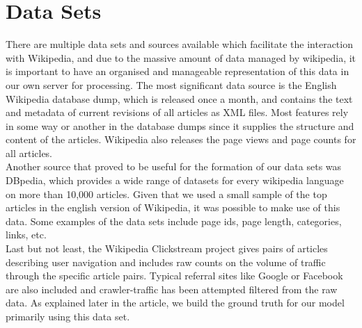 \section{Data Sets}

There are multiple data sets and sources available which facilitate the interaction with Wikipedia, and due to the massive amount of data managed by wikipedia, it is important to have an organised and manageable representation of this data in our own server for processing. The most significant data source is the English Wikipedia database dump, which is released once a month, and contains the text and metadata of current revisions of all articles as XML files. Most features rely in some way or another in the database dumps since it supplies the structure and content of the articles. Wikipedia also releases the page views and page counts for all articles. \\
Another source that proved to be useful for the formation of our data sets was DBpedia, which provides a wide range of datasets for every wikipedia language on more than 10,000 articles. Given that we used a small sample of the top articles in the english version of Wikipedia, it was possible to make use of this data. Some examples of the data sets include page ids, page length, categories, links, etc. \\
Last but not least, the Wikipedia Clickstream \cite{wulczyn} project gives pairs of articles describing user navigation and includes raw counts on the volume of traffic through the specific article pairs. Typical referral sites like Google or Facebook are also included and crawler-traffic has been attempted filtered from the raw data. As explained later in the article, we build the ground truth for our model primarily using this data set.